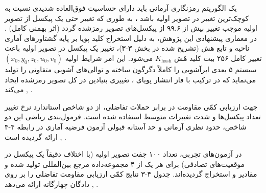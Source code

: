 

یک الگوریتم رمزنگاری آرمانی باید دارای حساسیت فوق‌العاده شدیدی نسبت به کوچک‌ترین تغییر در تصویر اولیه باشد ، به طوری که تغییر حتی یک پیکسل از تصویر اولیه موجب تغییر بیش از ۹۹.۶ از پیکسل‌های تصویر رمزشده گردد (اثر بهمنی کامل) . در معماری پیشنهادی این پژوهش، به دلیل استخراج کلید پویا بر پایه گشتاورهای آماری ناحیه  و تابع هش  (تشریح شده در بخش ۳{-}۳)، تغییر یک پیکسل در تصویر اولیه باعث تغییر کامل ۲۵۶ بیت کلید هَش $K_{\mathrm{hash}}$ می‌شود. این امر شرایط اولیه $(x_0,\allowbreak{} y_0,\allowbreak{} z_0,\allowbreak{} u_0,\allowbreak{} v_0)$ سیستم ۵ بعدی ابرآشوبی را کاملاً دگرگون ساخته و توالی‌های آشوبی متفاوتی را تولید می‌نماید که در ترکیب با فاز انتشار پویای ، تغییری بنیادین در کل تصویر رمزشده ایجاد می‌کند , .\par



جهت ارزیابی کمّی مقاومت در برابر حملات تفاضلی، از دو شاخص استاندارد نرخ تغییر تعداد پیکسل‌ها  و شدت تغییرات متوسط  استفاده شده است. فرمول‌بندی ریاضی این دو شاخص، حدود نظری آرمانی و حد آستانه قبولی آزمون فرضیه آماری در رابطه ۴{-}۴ ارائه گردیده است , .\par






در آزمون‌های تجربی، تعداد ۱۰۰ جفت تصویر اولیه (با اختلاف دقیقاً یک پیکسل در موقعیت‌های تصادفی) برای هر یک از ۴ مجموعه‌داده مرجع بین‌المللی تولید شده و مقادیر  و  استخراج گردیده‌اند. جدول ۴{-}۳ نتایج کمّی ارزیابی مقاومت تفاضلی را بر روی دادگان چهارگانه ارائه می‌دهد , .\par

